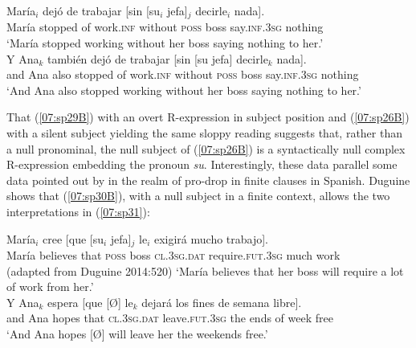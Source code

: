 \documentclass[output=paper,colorlinks,citecolor=brown,draft,draftmode]{langscibook}
\begin{document}
\begin{exe}
\ex\label{07:sp29}
\begin{xlista}
\ex
\gll\label{07:sp29A}María$_i$ dejó de trabajar [sin [su$_i$ jefa]$_j$ decirle$_i$ nada].\\
María stopped of work.\textsc{inf} without \textsc{poss} boss say.\textsc{inf}.\textsc{3sg} nothing\\
\glt ‘María stopped working without her boss saying nothing to her.’\\
\ex
\gll\label{07:sp29B}Y Ana$_k$ también dejó de trabajar [sin [su jefa] decirle$_k$ nada].\\
and Ana also stopped of work.\textsc{inf} without \textsc{poss} boss say.\textsc{inf}.\textsc{3sg} nothing\\
\glt ‘And Ana also stopped working without her boss saying nothing to her.’
\end{xlista}
\end{exe}


That (\ref{07:sp29B}) with an overt R-expression in subject position and (\ref{07:sp26B}) with a silent subject yielding the same sloppy reading suggests that, rather than a null pronominal, the null subject of (\ref{07:sp26B}) is a syntactically null complex R-expression embedding the pronoun \textit{su}.
Interestingly, these data parallel some data pointed out by \citet{duguine13, duguine14} in the realm of pro-drop in finite clauses in Spanish. Duguine shows that (\ref{07:sp30B}), with a null subject in a finite context, allows the two interpretations in (\ref{07:sp31}):

\begin{exe}
\ex\label{07:sp30}
\begin{xlista}
\ex
\gll\label{07:sp30A}María$_i$ cree [que [su$_i$ jefa]$_j$ le$_i$ exigirá mucho trabajo].\\
María believes that \textsc{poss} boss \textsc{cl.3sg.dat} require.\textsc{fut.3sg} much work\\ \hfill (adapted from Duguine 2014:520)
\glt ‘María believes that her boss will require a lot of work from her.’\\
\ex
\gll\label{07:sp30B}Y Ana$_k$ espera [que [Ø] le$_k$ dejará los fines de semana libre].\\
and Ana hopes that {} \textsc{cl.3sg.dat} leave.\textsc{fut.3sg} the ends of week free\\
\glt ‘And Ana hopes [Ø] will leave her the weekends free.’
\end{xlista}
\end{exe} %
\end{document}
